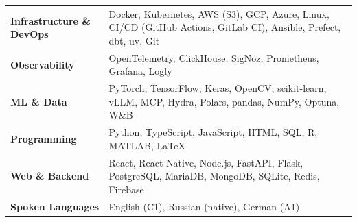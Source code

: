 \documentclass[11pt,a4paper]{article}
\begin{document}
\begin{tabularx}{\textwidth}{@{}l X@{}}
\textbf{Infrastructure \& DevOps} & Docker, Kubernetes, AWS (S3), GCP, Azure, Linux, CI/CD (GitHub Actions, GitLab CI), Ansible, Prefect, dbt, uv, Git \\[3pt]
\textbf{Observability} & OpenTelemetry, ClickHouse, SigNoz, Prometheus, Grafana, Logly \\[3pt]
\textbf{ML \& Data} & PyTorch, TensorFlow, Keras, OpenCV, scikit-learn, vLLM, MCP, Hydra, Polars, pandas, NumPy, Optuna, W\&B \\[3pt]
\textbf{Programming} & Python, TypeScript, JavaScript, HTML, SQL, R, MATLAB, \LaTeX \\[3pt]
\textbf{Web \& Backend} & React, React Native, Node.js, FastAPI, Flask, PostgreSQL, MariaDB, MongoDB, SQLite, Redis, Firebase \\[3pt]
\textbf{Spoken Languages} & English (C1), Russian (native), German (A1) \\
\end{tabularx}
\end{document}
